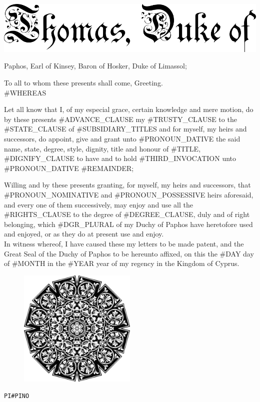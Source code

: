 \documentclass[varwidth=true,border=50pt]{standalone}
\begin{document}
\thispagestyle{fancy}

\noindent \includegraphics[width=\textwidth]{thomas_duke_of}

{\LARGE
Paphos, Earl of Kinsey, Baron of Hosker, Duke of Limassol;

\hspace{20pt} To all to whom these presents shall come, Greeting.\\

#WHEREAS

\hspace{20pt} Let all know that I, of my especial grace, certain knowledge and mere motion, do by these presents #ADVANCE_CLAUSE my #TRUSTY_CLAUSE \hspace{7pt}{\hoskeroe #GRANTEE}\hspace{7pt} to the #STATE_CLAUSE of \hspace{7pt}{\hoskeroe #TITLE}\hspace{7pt} #SUBSIDIARY_TITLES and for myself, my heirs and successors, do appoint, give and grant unto #PRONOUN_DATIVE the said name, state, degree, style, dignity, title and honour of #TITLE, #DIGNIFY_CLAUSE to have and to hold #THIRD_INVOCATION unto #PRONOUN_DATIVE #REMAINDER;

\hspace{20pt} Willing and by these presents granting, for myself, my heirs and successors, that #PRONOUN_NOMINATIVE and #PRONOUN_POSSESSIVE heirs aforesaid, and every one of them successively, may enjoy and use all the #RIGHTS_CLAUSE to the degree of #DEGREE_CLAUSE, duly and of right belonging, which #DGR_PLURAL of my Duchy of Paphos have heretofore used and enjoyed, or as they do at present use and enjoy.\\

\hspace{20pt} In witness whereof, I have caused these my letters to be made patent, and the Great Seal of the Duchy of Paphos to be hereunto affixed, on this the #DAY day of #MONTH in the #YEAR year of my regency in the Kingdom of Cyprus.
}

\begin{figure}[h]
\centering
\includegraphics[width=0.5\textwidth]{seal}
\end{figure}

\hfill {\footnotesize \texttt{PI{#PINO}}}
\end{document}
